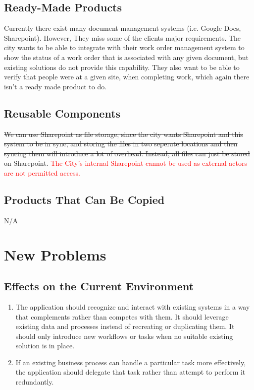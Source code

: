 \documentclass[12pt]{article}
\begin{document}
\subsection{Ready-Made Products}
Currently there exist many document management systems (i.e. Google Docs,
Sharepoint). However, They miss some of the clients major requirements. The
city wants to be able to integrate with their work order management system to
show the status of a work order that is associated with any given document,
but existing solutions do not provide this capability. They also want to be
able to verify that people were at a given site, when completing work, which
again there isn't a ready made product to do.
\subsection{Reusable Components}
\sout{We can use Sharepoint as file storage, since the city wants Sharepoint and this
system to be in sync, and storing the files in two seperate locations and then
syncing them will introduce a lot of overhead. Instead, all files can just be
stored on Sharepoint.} \textcolor{red}{The City's internal Sharepoint cannot be used as external actors are not permitted access.}
\subsection{Products That Can Be Copied}
N/A

\section{New Problems}
\subsection{Effects on the Current Environment}
\begin{enumerate}
  \item The application should recognize and interact with existing
    systems in a way that complements rather than competes with them.
    It should leverage existing data and processes instead of
    recreating or duplicating them.
    It should only introduce new workflows or tasks when no suitable
    existing solution is in place.
  \item If an existing business process can handle a particular task
    more effectively, the application should delegate that task
    rather than attempt to perform it redundantly.
\end{enumerate}
\end{document}
